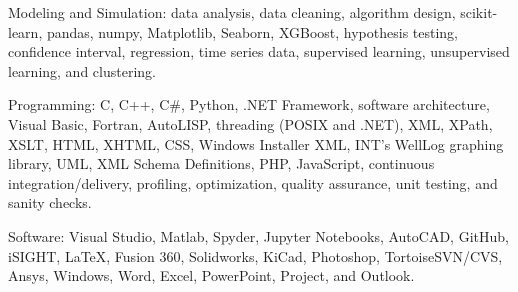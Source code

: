 \documentclass{leresume}
\begin{document}
    \begin{bulletedlist}
		
		\item Modeling and Simulation: data analysis,
                        data cleaning,
                        algorithm design,
                        scikit-learn,
                        pandas,
                        numpy,
                        Matplotlib,
                        Seaborn,
                        XGBoost,
                        hypothesis testing,
                        confidence interval,
                        regression,
                        time series data,
                        supervised learning,
                        unsupervised learning,
                        and clustering.
                        
		\item Programming: C,
                        C++,
                        C\#,
                        Python,
                        .NET Framework,
                        software architecture,
                        Visual Basic,
                        Fortran,
                        AutoLISP,
                        threading (POSIX and .NET),
                        XML,
                        XPath,
                        XSLT,
                        HTML,
                        XHTML,
                        CSS,
                        Windows Installer XML,
                        INT's WellLog graphing library,
                        UML,
                        XML Schema Definitions,
                        PHP,
                        JavaScript,
                        continuous integration/delivery,
                        profiling,
                        optimization,
                        quality assurance,
                        unit testing,
                        and sanity checks.
                        
		\item Software: Visual Studio,
                        Matlab,
                        Spyder,
                        Jupyter Notebooks,
                        AutoCAD,
                        GitHub,
                        iSIGHT,
                        LaTeX,
                        Fusion 360,
                        Solidworks,
                        KiCad,
                        Photoshop,
                        TortoiseSVN/CVS,
                        Ansys,
                        Windows,
                        Word,
                        Excel,
                        PowerPoint,
                        Project,
                        and Outlook.
                        

\end{bulletedlist}
\end{document}
